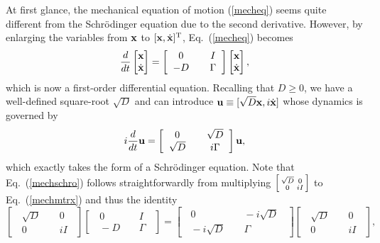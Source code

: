 \documentclass{tADP2e}
\theoremstyle{plain}
\theoremstyle{plain}
\theoremstyle{definition}
\begin{document}
\vspace{3pt}
\noindent
At first glance, the mechanical equation of motion (\ref{mecheq}) seems quite different from the Schr\"odinger equation due to the second derivative. However, by enlarging the variables from $\bold{x}$ to $[\bold{x},\dot{\bold{x}}]^{\rm T}$, Eq.~(\ref{mecheq}) becomes \cite{SR16}
\begin{equation}
\frac{d}{dt}\begin{bmatrix} \bold{x} \\ \dot{\bold{x}} \end{bmatrix} = \begin{bmatrix} \;\;0\;\; & \;\;I\;\; \\ \;\;-D\;\; & \;\;\Gamma\;\; \end{bmatrix} \begin{bmatrix} \bold{x} \\ \dot{\bold{x}} \end{bmatrix},
\label{mechmtrx}
\end{equation}
which is now a first-order differential equation. Recalling that $D\ge0$, we have a well-defined square-root $\sqrt{D}$ and can introduce $\bold{u}\equiv[\sqrt{D}\bold{x},i\dot{\bold{x}}]$ whose dynamics is governed by \cite{KCL14,TCL15,HSD16}
\begin{equation}
i\frac{d}{dt}\bold{u}=\begin{bmatrix} \;\;0\;\; & \;\;\sqrt{D}\;\; \\ \;\;\sqrt{D}\;\; & \;\;i\Gamma\;\; \end{bmatrix}\bold{u},
\label{mechschro}
\end{equation}
which exactly takes the form of a Schr\"odinger equation. Note that Eq.~(\ref{mechschro}) follows straightforwardly from multiplying $\begin{bsmallmatrix} \sqrt{D} & 0 \\ 0 & iI \end{bsmallmatrix}$ to Eq.~(\ref{mechmtrx}) and thus the identity
\begin{equation}
 \begin{bmatrix} \;\;\sqrt{D}\;\; & \;\;0\;\; \\ \;\;0\;\; & \;\;iI\;\; \end{bmatrix} \begin{bmatrix} \;\;0\;\; & \;\;I\;\; \\ \;\;-D\;\; & \;\;\Gamma\;\; \end{bmatrix} = \begin{bmatrix} \;\;0\;\; & \;\;-i\sqrt{D}\;\; \\ \;\;-i\sqrt{D}\;\; & \;\;\Gamma\;\; \end{bmatrix} \begin{bmatrix} \;\;\sqrt{D}\;\; & \;\;0\;\; \\ \;\;0\;\; & \;\;iI\;\; \end{bmatrix},
\end{equation}
\end{document}
